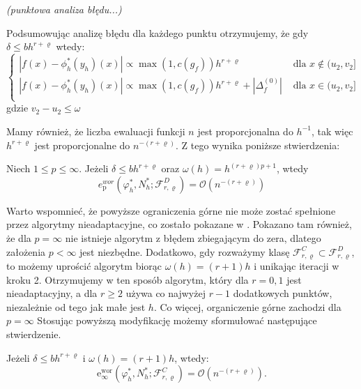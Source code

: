 \documentclass[oik, pdftex, robocza, man]{mgrwms}
\begin{document}
\textit{(punktowa analiza błędu...)}

Podsumowując analizę błędu dla każdego punktu otrzymujemy, że gdy $\delta \leq bh^{r+\varrho}$ wtedy:
\begin{equation*}
    \begin{cases}
        |f(x) - \phi_{h}^{*}(y_{h})(x)| \propto \max(1, c(g_{f})) h^{r+\varrho} & \text{ dla } x \notin (u_{2}, v_{2}] \\
        |f(x) - \phi_{h}^{*}(y_{h})(x)| \propto \max(1, c(g_{f})) h^{r+\varrho} + |\Delta_{f}^{(0)}| & \text{ dla } x \in (u_{2}, v_{2}] \\
    \end{cases}
\end{equation*}
gdzie $v_{2} - u_{2} \leq \omega$

Mamy również, że liczba ewaluacji funkcji $n$ jest proporcjonalna do $h^{-1}$, tak więc $h^{r+\varrho}$ jest proporcjonalne do $n^{-(r+\varrho)}$. Z tego wynika poniższe stwierdzenia:
\begin{stw}
    \label{stw2}
    Niech $1 \leq p \leq \infty$. Jeżeli $\delta \leq bh^{r+\varrho}$ oraz $\omega(h) = h^{(r+\varrho)p + 1}$, wtedy
    \begin{equation*}
        e_{\mathrm{p}}^{wor}\left(\varphi_{h}^{*}, N_{h}^{*} ; \mathcal{F}_{r, \varrho}^{D}\right)=\mathcal{O}\left(n^{-(r+\varrho)}\right)
    \end{equation*}
\end{stw}

Warto wspomnieć, że powyższe ograniczenia górne nie może zostać spełnione przez algorytmy nieadaptacyjne, co zostało pokazane w \cite{PoA}. Pokazano tam również, że dla $p=\infty$ nie istnieje algorytm z błędem zbiegającym do zera, dlatego założenia $p < \infty$ jest niezbędne. Dodatkowo, gdy rozważymy klasę $\mathcal{F}_{r, \varrho}^{C} \subset \mathcal{F}_{r, \varrho}^{D}$, to możemy uprościć algorytm biorąc $\omega(h) = (r+1)h$ i unikając iteracji w kroku 2. Otrzymujemy w ten sposób algorytm, który dla $r=0,1$ jest nieadaptacyjny, a dla $r \geq 2$ używa co najwyżej $r-1$ dodatkowych punktów, niezależnie od tego jak małe jest $h$. Co więcej, organiczenie górne zachodzi dla $p = \infty$
Stosując powyższą modyfikację możemy sformułować następujące stwierdzenie.

\begin{stw}
    \label{stw3}
    Jeżeli $\delta \leq bh^{r+\varrho}$ i $\omega(h) = (r+1)h$, wtedy:
    \begin{equation}
        \mathrm{e}_{\infty}^{\mathrm{wor}}\left(\varphi_{h}^{*}, N_{h}^{*} ; \mathcal{F}_{r, \varrho}^{C}\right)=\mathcal{O}\left(n^{-(r+\varrho)}\right) .
    \end{equation}
\end{stw}
\end{document}
